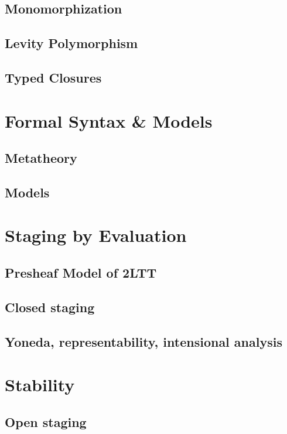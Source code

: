 \documentclass[acmsmall]{acmart}
\theoremstyle{remark}
\begin{document}
\subsection{Monomorphization}

\subsection{Levity Polymorphism}

\subsection{Typed Closures}

\section{Formal Syntax \& Models}

\subsection{Metatheory}
\subsection{Models}

\section{Staging by Evaluation}

\subsection{Presheaf Model of 2LTT}

\subsection{Closed staging}
\subsection{Yoneda, representability, intensional analysis}

\section{Stability}

\subsection{Open staging}
\end{document}
